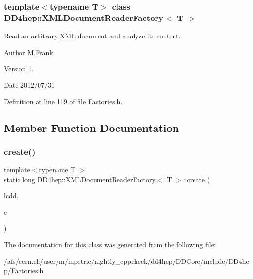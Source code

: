 \subsubsection*{template$<$typename T$>$\newline
class D\+D4hep\+::\+X\+M\+L\+Document\+Reader\+Factory$<$ T $>$}

Read an arbitrary \hyperlink{namespace_d_d4hep_1_1_x_m_l}{X\+ML} document and analyze it\textquotesingle{}s content. 

\begin{DoxyAuthor}{Author}
M.\+Frank 
\end{DoxyAuthor}
\begin{DoxyVersion}{Version}
1. 
\end{DoxyVersion}
\begin{DoxyDate}{Date}
2012/07/31 
\end{DoxyDate}


Definition at line 119 of file Factories.\+h.



\subsection{Member Function Documentation}
\hypertarget{class_d_d4hep_1_1_x_m_l_document_reader_factory_aa504d333a2f40d12a83d0f2d2585938f}{}\label{class_d_d4hep_1_1_x_m_l_document_reader_factory_aa504d333a2f40d12a83d0f2d2585938f} 
\subsubsection{\texorpdfstring{create()}{create()}}
{\footnotesize\ttfamily template$<$typename T $>$ \\
static long \hyperlink{class_d_d4hep_1_1_x_m_l_document_reader_factory}{D\+D4hep\+::\+X\+M\+L\+Document\+Reader\+Factory}$<$ \hyperlink{class_t}{T} $>$\+::create (\begin{DoxyParamCaption}\item[{\hyperlink{class_d_d4hep_1_1_geometry_1_1_l_c_d_d}{Geometry\+::\+L\+C\+DD} \&}]{lcdd,  }\item[{\hyperlink{struct_d_d4hep_1_1_plugin_factory_base_aedebe6835e2705756763812545bcb8fd}{xml\+\_\+h}}]{e }\end{DoxyParamCaption})\hspace{0.3cm}{\ttfamily [static]}}



The documentation for this class was generated from the following file\+:\begin{DoxyCompactItemize}
\item 
/afs/cern.\+ch/user/m/mpetric/nightly\+\_\+cppcheck/dd4hep/\+D\+D\+Core/include/\+D\+D4hep/\hyperlink{_d_d_core_2include_2_d_d4hep_2_factories_8h}{Factories.\+h}\end{DoxyCompactItemize}
